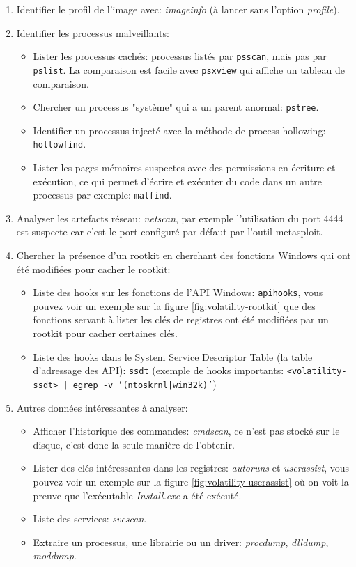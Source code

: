 \begin{enumerate}
    \item Identifier le profil de l'image avec: \textit{imageinfo} (à lancer sans l'option \textit{profile}).
    \item Identifier les processus malveillants:
    \begin{itemize}
        \item Lister les processus cachés: processus listés par \texttt{psscan}, mais pas par \texttt{pslist}. La comparaison est facile avec \texttt{psxview} qui affiche un tableau de comparaison.
        \item Chercher un processus "système" qui a un parent anormal: \texttt{pstree}.
        \item Identifier un processus injecté avec la méthode de process hollowing: \texttt{hollowfind}.
        \item Lister les pages mémoires suspectes avec des permissions en écriture et exécution, ce qui permet d'écrire et exécuter du code dans un autre processus par exemple: \texttt{malfind}.
    \end{itemize}
    \item Analyser les artefacts réseau: \textit{netscan}, par exemple l'utilisation du port 4444 est suspecte car c'est le port configuré par défaut par l'outil metasploit.
    \item Chercher la présence d'un rootkit en cherchant des fonctions Windows qui ont été modifiées pour cacher le rootkit:
    \begin{itemize}
        \item Liste des hooks sur les fonctions de l'API Windows: \texttt{apihooks}, vous pouvez voir un exemple sur la figure \ref{fig:volatility-rootkit} que des fonctions servant à lister les clés de registres ont été modifiées par un rootkit pour cacher certaines clés.
        \item Liste des hooks dans le System Service Descriptor Table (la table d'adressage des API): \texttt{ssdt} (exemple de hooks importants: \texttt{<volatility-ssdt> | egrep -v '(ntoskrnl|win32k)'})
    \end{itemize}
    \item Autres données intéressantes à analyser:
    \begin{itemize}
        \item Afficher l'historique des commandes: \textit{cmdscan}, ce n'est pas stocké sur le disque, c'est donc la seule manière de l'obtenir.
        \item Lister des clés intéressantes dans les registres: \textit{autoruns} et \textit{userassist}, vous pouvez voir un exemple sur la figure \ref{fig:volatility-userassist} où on voit la preuve que l'exécutable \textit{Install.exe} a été exécuté.
        \item Liste des services: \textit{svcscan}.
        \item Extraire un processus, une librairie ou un driver: \textit{procdump}, \textit{dlldump}, \textit{moddump}.
    \end{itemize}
\end{enumerate}

